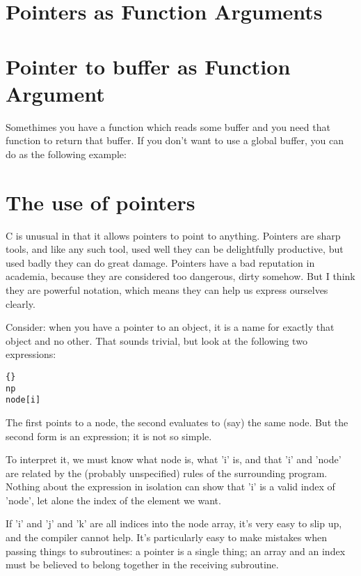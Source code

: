 \documentclass{report}
\begin{document}
\section{Pointers as Function Arguments}



\section{Pointer to buffer as Function Argument}
Somethimes you have a function which reads some buffer and you need that function to return that buffer. If you don't want to use a global buffer, you can do as the following example:




\section{The use of pointers}
C is unusual in that it allows pointers to point to anything. Pointers are sharp tools, and like any such tool, used well they can be delightfully productive, but used badly they can do great damage. Pointers have a bad reputation in academia, because they are considered too dangerous, dirty somehow. But I think they are powerful notation, which means they can help us express ourselves clearly.

Consider: when you have a pointer to an object, it is a name for exactly that object and no other. That sounds trivial, but look at the following two expressions: 
\begin{lstlisting}{}
np
node[i]
\end{lstlisting}
The first points to a node, the second evaluates to (say) the same node. But the second form is an expression; it is not so simple.

To interpret it, we must know what node is, what 'i' is, and that 'i' and 'node' are related by the (probably unspecified) rules of the surrounding program. Nothing about the expression in isolation can show that 'i' is a valid index of 'node', let alone the index of the element we want.

If 'i' and 'j' and 'k' are all indices into the node array, it's very easy to slip up, and the compiler cannot help. It's particularly easy to make mistakes when passing things to subroutines: a pointer is a single thing; an array and an index must be believed to belong together in the receiving subroutine. 
\end{document}
